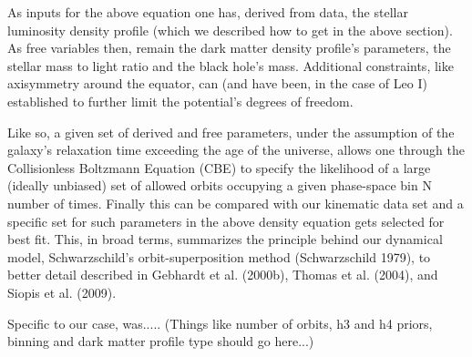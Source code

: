 \documentclass[%
 aip,
 twocolumn,
 jmp,%
 amsmath,amssymb,
 reprint,%
]{aastex61}
\begin{document}
As inputs for the above equation one has, derived from data, the stellar luminosity density profile (which we described how to get in the above section). As free variables then, remain the dark matter density profile's parameters, the stellar mass to light ratio and the black hole's mass. Additional constraints, like axisymmetry around the equator, can (and have been, in the case of Leo I) established to further limit the potential's degrees of freedom.

Like so, a given set of derived and free parameters, under the assumption of the galaxy's relaxation time exceeding the age of the universe, allows one through the Collisionless Boltzmann Equation (CBE) to specify the likelihood of a large (ideally unbiased) set of allowed orbits occupying a given phase-space bin N number of times. Finally this can be compared with our kinematic data set and a specific set for such parameters in the above density equation gets selected for best fit. This, in broad terms, summarizes the principle behind our dynamical model, Schwarzschild's orbit-superposition method (Schwarzschild 1979), to better detail described in Gebhardt et al. (2000b), Thomas et al. (2004), and Siopis et al. (2009).

Specific to our case, was..... (Things like number of orbits, h3 and h4 priors, binning and dark matter profile type should go here...)




\end{document}
